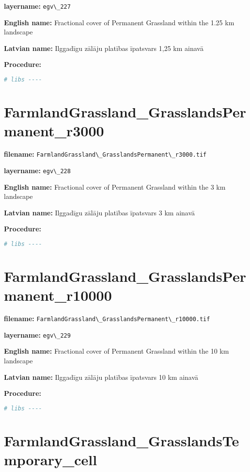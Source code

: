 \documentclass[
]{book}
\newcommand{\passthrough}[1]{#1}
\begin{document}
\textbf{layername:} \passthrough{\lstinline!egv\_227!}

\textbf{English name:} Fractional cover of Permanent Grassland within the 1.25 km landscape

\textbf{Latvian name:} Ilggadīgu zālāju platības īpatsvars 1,25 km ainavā

\textbf{Procedure:}

\begin{lstlisting}[language=R]
# libs ----
\end{lstlisting}

\section{FarmlandGrassland\_GrasslandsPermanent\_r3000}\label{ch06.228}

\textbf{filename:} \passthrough{\lstinline!FarmlandGrassland\_GrasslandsPermanent\_r3000.tif!}

\textbf{layername:} \passthrough{\lstinline!egv\_228!}

\textbf{English name:} Fractional cover of Permanent Grassland within the 3 km landscape

\textbf{Latvian name:} Ilggadīgu zālāju platības īpatsvars 3 km ainavā

\textbf{Procedure:}

\begin{lstlisting}[language=R]
# libs ----
\end{lstlisting}

\section{FarmlandGrassland\_GrasslandsPermanent\_r10000}\label{ch06.229}

\textbf{filename:} \passthrough{\lstinline!FarmlandGrassland\_GrasslandsPermanent\_r10000.tif!}

\textbf{layername:} \passthrough{\lstinline!egv\_229!}

\textbf{English name:} Fractional cover of Permanent Grassland within the 10 km landscape

\textbf{Latvian name:} Ilggadīgu zālāju platības īpatsvars 10 km ainavā

\textbf{Procedure:}

\begin{lstlisting}[language=R]
# libs ----
\end{lstlisting}

\section{FarmlandGrassland\_GrasslandsTemporary\_cell}\label{ch06.230}
\end{document}
